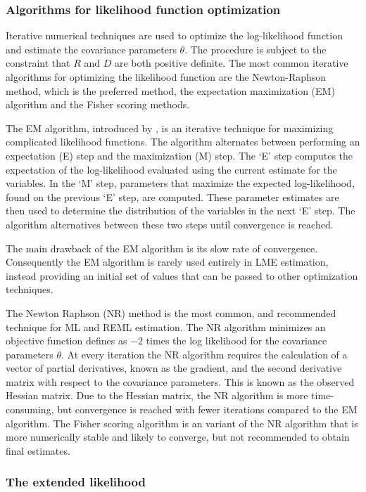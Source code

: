 \documentclass[12pt, a4paper]{article}
\theoremstyle{plain}
\theoremstyle{definition}
\theoremstyle{remark}
\begin{document}
\subsubsection{Algorithms for likelihood function optimization}Iterative numerical techniques are used to optimize the log-likelihood function and estimate the covariance parameters $\theta$. The procedure is subject to the constraint that $R$ and $D$ are both positive definite. The most common iterative algorithms for optimizing the likelihood function are the Newton-Raphson method, which is the preferred method, the expectation maximization (EM) algorithm and the Fisher scoring methods.

The EM algorithm, introduced by \citet{EM}, is an iterative technique for maximizing complicated likelihood functions. The algorithm alternates between performing an expectation (E) step
and the maximization (M) step. The `E' step computes the expectation of the log-likelihood evaluated using the current
estimate for the variables. In the `M' step, parameters that maximize the expected log-likelihood, found on the previous `E' step, are computed. These parameter estimates are then used to determine the distribution of the variables in the next `E' step. The algorithm alternatives between these two steps until convergence is reached.

The main drawback of the EM algorithm is its slow rate of
convergence. Consequently the EM algorithm is rarely used entirely in LME estimation,
instead providing an initial set of values that can be passed to
other optimization techniques.

The Newton Raphson (NR) method is the most common, and recommended technique for ML and
REML estimation. The NR algorithm minimizes an objective function defines as $-2$ times the log likelihood for the covariance parameters $\theta$. At every iteration the NR algorithm requires the
calculation of a vector of partial derivatives, known as the gradient, and the second derivative matrix with respect to the covariance parameters. This is known as the observed Hessian matrix. Due to the Hessian matrix, the NR algorithm is more time-consuming, but convergence is reached with fewer iterations compared to the EM algorithm. The Fisher scoring algorithm is an variant of the NR algorithm that is more numerically stable and likely to converge, but not recommended to obtain final estimates.

\subsubsection{The extended likelihood}
\end{document}
